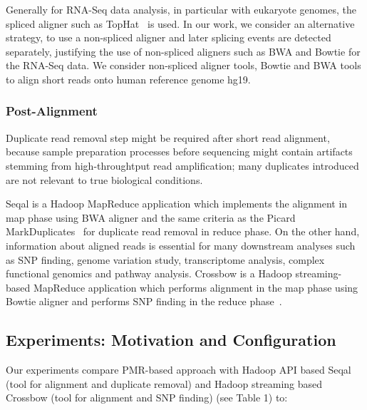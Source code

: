 \documentclass{acm_proc_article-sp}
\begin{document}
Generally for RNA-Seq data analysis, in particular with eukaryote
genomes, the spliced aligner such as TopHat~\cite{pepke2009} is
used. In our work, we consider an alternative strategy, to use a
non-spliced aligner and later splicing events are detected separately,
justifying the use of non-spliced aligners such as BWA and Bowtie for
the RNA-Seq data. We consider non-spliced aligner tools, Bowtie and
BWA tools to align short reads onto human reference genome hg19.

\subsubsection{Post-Alignment}
Duplicate read removal step might be required after short read
alignment, because sample preparation processes before sequencing
might contain artifacts stemming from high-throughtput read
amplification; many duplicates introduced are not relevant to true
biological conditions. 

Seqal is a Hadoop MapReduce application which implements the alignment
in map phase using BWA aligner and the same criteria as the Picard
MarkDuplicates~\cite{seal2011,seal_2011_mapred} for duplicate read
removal in reduce phase.  On the other hand, information about aligned
reads is essential for many downstream analyses such as SNP finding,
genome variation study, transcriptome analysis, complex functional
genomics and pathway analysis.  Crossbow is a Hadoop streaming-based
MapReduce application which performs alignment in the map phase using
Bowtie aligner and performs SNP finding in the reduce
phase~\cite{langmead2009}.


\subsection{Experiments: Motivation and Configuration}


Our experiments compare PMR-based approach with Hadoop API based Seqal
(tool for alignment and duplicate removal) and Hadoop streaming based
Crossbow (tool for alignment and SNP finding) (see Table 1) to:
\end{document}
